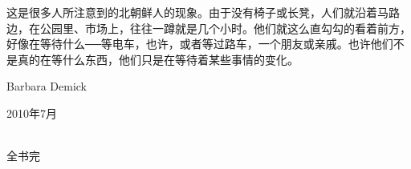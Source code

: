 这是很多人所注意到的北朝鲜人的现象。由于没有椅子或长凳，人们就沿着马路边，在公园里、市场上，往往一蹲就是几个小时。他们就这么直勾勾的看着前方，好像在等待什么──等电车，也许，或者等过路车，一个朋友或亲戚。也许他们不是真的在等什么东西，他们只是在等待着某些事情的变化。

\begin{flushright}
	Barbara Demick

	2010年7月
\end{flushright}


\begin{center}
	\textcolor{PinYinColor}
	{\faBookmark\\
		全书完\\}
\end{center}
